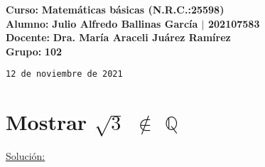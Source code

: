 \documentclass[12pt]{article}
\newenvironment{MyColorPar}[1]{%
    \leavevmode\color{#1}\ignorespaces%
}{%
}%
\begin{document}
    \large{\bf{\textsf{Curso:}}} {\bfseries{{\textcolor{brightturquoise}{Matemáticas básicas \bfseries{(N.R.C.:25598)}}}}} \\
    \large{\bf{\textsf{Alumno:}}} {\bfseries{{\textcolor{prussianblue}{Julio Alfredo Ballinas García {\large{{$\mid$}}} 202107583}}}}  \\
    \large{\bf{\textsf{Docente:}}} {\bfseries{{\textcolor{wisteria}{Dra. María Araceli Juárez Ramírez}}}}\\
    \large{\bf{\textsf{Grupo:}}} {\bfseries{{\textcolor{verde_manzana}{102}}}}\\

\vfill
    
\begin{center} 

    \texttt{12 de noviembre de 2021}
    
\end{center}

\newpage


\section*{\textsf{Mostrar} $\sqrt{3}$ $\notin$  $\mathbb{Q}$ } \vspace{0.2cm}

\begin{MyColorPar}{Cinnabar} \bfseries

\underline{Solución:} 

\end{MyColorPar} 
\end{document}
